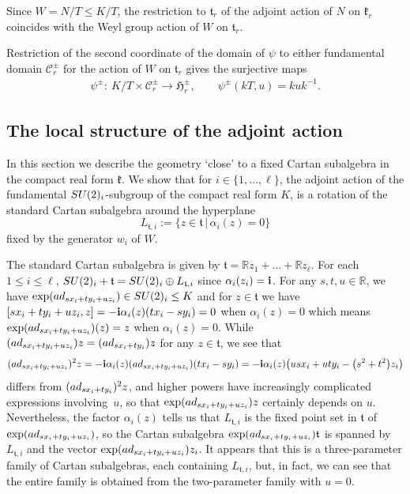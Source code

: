 \documentclass[11pt]{article}
\numberwithin{equation}{section}
\numberwithin{equation}{section}
\def\R{\mathbb{R}}
\def\a{\alpha}
\def\bi{{\bf i}}
\def\cC{\mathcal C}
\def\fH{\mathfrak{H}}
\def\k{\mathfrak{k}}
\def\ft{\mathfrak{t}}
\begin{document}
Since $W=N/T\leq K/T$, the restriction to $\ft_r$ of the adjoint action of $N$ on $\k_r$ coincides with the Weyl group action of $W$ on $\ft_r$.

Restriction of the second coordinate of the domain of $\psi$ to either fundamental domain $\cC_r^\pm$ for the action of $W$ on $\ft_r$ gives the surjective maps
\begin{gather*}
\psi^\pm\colon \ K/T\times \cC_r^\pm\longrightarrow \fH^\pm_r, \qquad \psi^\pm(kT,u) = kuk^{-1}.
\end{gather*}

\subsection{The local structure of the adjoint action}\label{section:localstructure}

In this section we describe the geometry `close' to a fixed Cartan subalgebra in the compact real form $\k$. We show that for $i\in \{1, \dots, {\ell}\}$, the adjoint action of the fundamental ${\rm SU}(2)_i$-subgroup of the compact real form $K$, is a rotation of the standard Cartan subalgebra around the hyperplane
\[L_{\ft,i}:=\{z\in \ft\, |\, \alpha_i(z)=0\}\]
fixed by the generator $w_i$ of $W$.

The standard Cartan subalgebra is given by $\ft= \R z_1 +\dots + \R z_{\ell}$.
For each $1\leq i \leq \ell$, ${\rm SU}(2)_i + \ft = {\rm SU}(2)_i \oplus L_{\ft,i}$ since $\a_i(z_i) = \bi$.
For any $s,t,u\in\R$, we have $\exp({\rm ad}_{sx_i+ty_i+uz_i})\in {\rm SU}(2)_i\leq K$ and for $z\in\ft$ we have
$ [sx_i+ty_i+uz_i,z] = -\bi\alpha_i(z) (tx_i-sy_i) = 0$ when $\alpha_i(z) = 0$ which means $\exp({\rm ad}_{sx_i+ty_i+uz_i})(z) = z$ when
$\alpha_i(z) = 0$. While $({\rm ad}_{sx_i+ty_i+uz_i})z = ({\rm ad}_{sx_i+ty_i})z$ for any $z\in\ft$, we see that
\begin{gather*} ({\rm ad}_{sx_i+ty_i+uz_i})^2 z = -\bi\alpha_i(z) ({\rm ad}_{sx_i+ty_i+uz_i})(tx_i-sy_i) = -\bi\alpha_i(z) \big(usx_i + uty_i - \big(s^2+t^2\big)z_i\big)
\end{gather*}
differs from $({\rm ad}_{sx_i+ty_i})^2 z$, and higher powers have increasingly complicated expressions involving~$u$, so that $\exp({\rm ad}_{sx_i+ty_i+uz_i})z$ certainly depends on $u$. Nevertheless, the factor $\alpha_i(z)$ tells us that $L_{\ft,i}$ is the fixed point set in $\ft$ of $\exp({\rm ad}_{sx_i+ty_i+uz_i})$, so the Cartan subalgebra $\exp({\rm ad}_{sx_i+ty_i+uz_i})\ft$ is
spanned by $L_{\ft,i}$ and the vector $\exp({\rm ad}_{sx_i+ty_i+uz_i})z_i$. It appears that this is a three-parameter family of Cartan subalgebras, each containing $L_{\ft,i}$, but, in fact, we can see that the entire family is obtained from the two-parameter family with $u = 0$.
\end{document}
